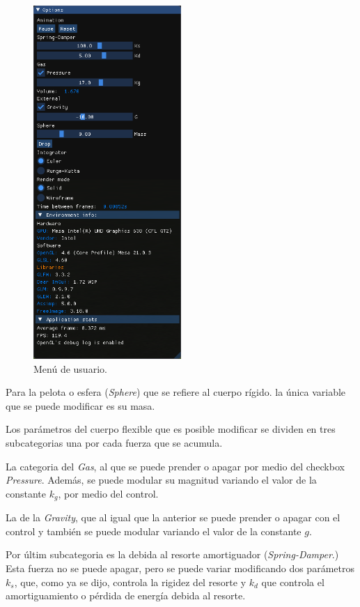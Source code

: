 \begin{figure}
 \centering
 \includegraphics[width=0.5\textwidth]{Img/04/menu}
 \caption[Menú de usuario del programa]{Menú de usuario.}
 \label{programa:menu}
\end{figure}

Para la pelota o esfera (\emph{\textenglish{Sphere}}) que se refiere al cuerpo rígido.
la única variable que se puede modificar es su masa.

Los parámetros del cuerpo flexible que es posible modificar se dividen en tres subcategorias una por cada fuerza que se acumula.

La categoria del \emph{Gas}, al que se puede prender o apagar por medio del checkbox \emph{\textenglish{Pressure}}. 
Además, se puede modular su magnitud variando el valor de la constante $k_{g}$, por medio del control.

La de la \emph{\textenglish{Gravity}}, que al igual que la anterior se puede prender o apagar con el control  y también se puede modular variando el valor de la constante $g$.

Por últim subcategoria es la debida al resorte amortiguador (\emph{\textenglish{Spring-Damper}}.)
Esta fuerza no se puede apagar, pero se puede variar modificando dos parámetros $k_{s}$, que, como ya se dijo, controla la rigidez del resorte y $k_{d}$ que controla el amortiguamiento o pérdida de energía debida al resorte.

